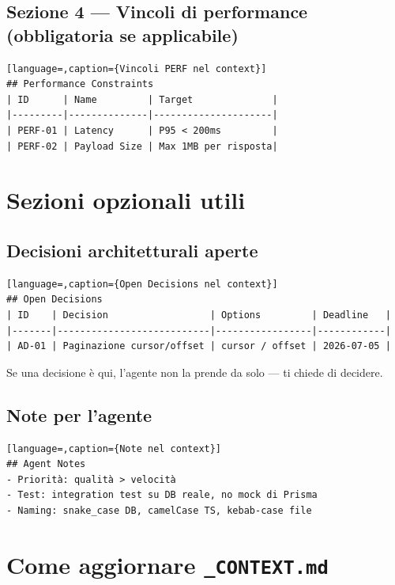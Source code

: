 \subsection*{Sezione 4 --- Vincoli di performance (obbligatoria se applicabile)}

\begin{lstlisting}[language=,caption={Vincoli PERF nel context}]
## Performance Constraints
| ID      | Name         | Target              |
|---------|--------------|---------------------|
| PERF-01 | Latency      | P95 < 200ms         |
| PERF-02 | Payload Size | Max 1MB per risposta|
\end{lstlisting}

\section{Sezioni opzionali utili}
\label{sec:04-sezioni-opzionali}

\subsection*{Decisioni architetturali aperte}

\begin{lstlisting}[language=,caption={Open Decisions nel context}]
## Open Decisions
| ID    | Decision                  | Options         | Deadline   |
|-------|---------------------------|-----------------|------------|
| AD-01 | Paginazione cursor/offset | cursor / offset | 2026-07-05 |
\end{lstlisting}

Se una decisione è qui, l'agente non la prende da solo --- ti chiede di decidere.

\subsection*{Note per l'agente}

\begin{lstlisting}[language=,caption={Note nel context}]
## Agent Notes
- Priorità: qualità > velocità
- Test: integration test su DB reale, no mock di Prisma
- Naming: snake_case DB, camelCase TS, kebab-case file
\end{lstlisting}

\section{Come aggiornare \texttt{\_CONTEXT.md}}
\label{sec:04-aggiornamento}

